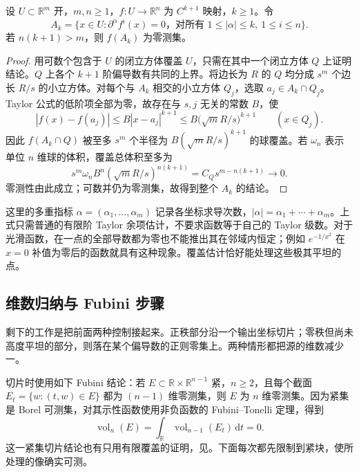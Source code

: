 \begin{lemma}\label{g2:lem:sard-flat-cover}
	设 \(U\subset\mathbb R^m\) 开，\(m,n\ge1\)，\(f:U\to\mathbb R^n\) 为 \(C^{k+1}\) 映射，\(k\ge1\)。令
	\[
		A_k=\{x\in U:\partial^\alpha f^i(x)=0\text{，对所有 }1\le|\alpha|\le k,\ 1\le i\le n\}.
	\]
	若 \(n(k+1)>m\)，则 \(f(A_k)\) 为零测集。
\end{lemma}
\begin{proof}
	用可数个包含于 \(U\) 的闭立方体覆盖 \(U\)，只需在其中一个闭立方体 \(Q\) 上证明结论。\(Q\) 上各个 \(k+1\) 阶偏导数有共同的上界。将边长为 \(R\) 的 \(Q\) 均分成 \(s^m\) 个边长 \(R/s\) 的小立方体。对每个与 \(A_k\) 相交的小立方体 \(Q_j\)，选取 \(a_j\in A_k\cap Q_j\)。Taylor 公式的低阶项全部为零，故存在与 \(s,j\) 无关的常数 \(B\)，使
	\[
		|f(x)-f(a_j)|\le B|x-a_j|^{k+1}
		\le B\bigl(\sqrt m R/s\bigr)^{k+1}\qquad(x\in Q_j).
	\]
	因此 \(f(A_k\cap Q)\) 被至多 \(s^m\) 个半径为 \(B(\sqrt m R/s)^{k+1}\) 的球覆盖。若 \(\omega_n\) 表示单位 \(n\) 维球的体积，覆盖总体积至多为
	\[
		s^m\omega_n B^n(\sqrt m R/s)^{n(k+1)}
		=C_Qs^{m-n(k+1)}\longrightarrow0.
	\]
	零测性由此成立；可数并仍为零测集，故得到整个 \(A_k\) 的结论。
\end{proof}

这里的多重指标 \(\alpha=(\alpha_1,\ldots,\alpha_m)\) 记录各坐标求导次数，\(|\alpha|=\alpha_1+\cdots+\alpha_m\)。上式只需普通的有限阶 Taylor 余项估计，不要求函数等于自己的 Taylor 级数。对于光滑函数，在一点的全部导数都为零也不能推出其在邻域内恒定；例如 \(e^{-1/x^2}\) 在 \(x=0\) 补值为零后的函数就具有这种现象。覆盖估计恰好能处理这些极其平坦的点。

\subsection{维数归纳与 Fubini 步骤}
\label{g2:subsec:1402:03}

剩下的工作是把前面两种控制接起来。正秩部分沿一个输出坐标切片；零秩但尚未高度平坦的部分，则落在某个偏导数的正则零集上。两种情形都把源的维数减少一。

\ProseParagraphBreak

切片时使用如下 Fubini 结论：若 \(E\subset\mathbb R\times\mathbb R^{n-1}\) 紧，\(n\ge2\)，且每个截面 \(E_t=\{w:(t,w)\in E\}\) 都为 \((n-1)\) 维零测集，则 \(E\) 为 \(n\) 维零测集。因为紧集是 Borel 可测集，对其示性函数使用非负函数的 Fubini--Tonelli 定理，得到
\[
	\operatorname{vol}_n(E)=\int_{\mathbb R}\operatorname{vol}_{n-1}(E_t)\,\mathrm{d}t=0.
\]
这一紧集切片结论也有只用有限覆盖的证明，见\cite[第126页，引理6.2]{Lee2012Smooth}。下面每次都先限制到紧块，使所处理的像确实可测。

